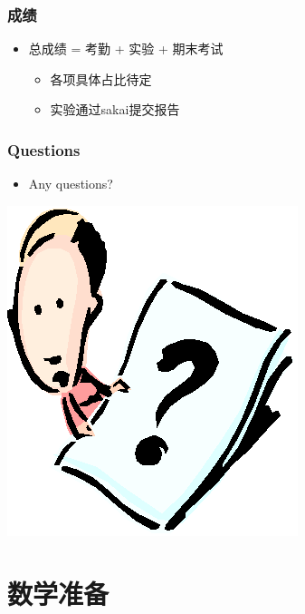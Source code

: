 \documentclass[CJKutf8,xcolor=pdftex,dvipsnames,table]{beamer}
\begin{document}
\begin{CJK*}{UTF8}{song}
  \begin{frame}
    \frametitle{成绩}
    \begin{itemize}
    \item 总成绩 = 考勤 + 实验 + 期末考试
        \begin{itemize}   
        \item 各项具体占比待定
        \item 实验通过sakai提交报告 
        \end{itemize}
    \end{itemize}
  \end{frame}

  \begin{frame}
    \frametitle{Questions}
    \begin{itemize}
    \item Any questions?
    \end{itemize}
    \begin{center}
      \includegraphics[scale=.5]{question}
    \end{center}
  \end{frame}
  
  \section{数学准备}
  

\end{CJK*}
\end{document}
